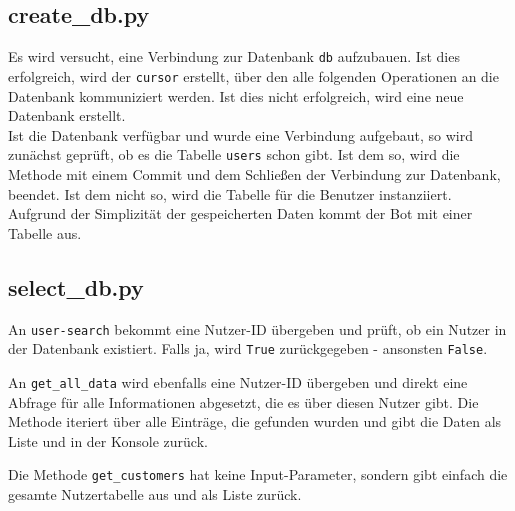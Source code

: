         \subsection{create\_db.py}
            Es wird versucht, eine Verbindung zur Datenbank \verb|db| aufzubauen. Ist dies erfolgreich, wird der \verb|cursor| erstellt, über den alle folgenden Operationen an die Datenbank kommuniziert werden. Ist dies nicht erfolgreich, wird eine neue Datenbank erstellt.\\
            Ist die Datenbank verfügbar und wurde eine Verbindung aufgebaut, so wird zunächst geprüft, ob es die Tabelle \verb|users| schon gibt. Ist dem so, wird die Methode mit einem Commit und dem Schließen der Verbindung zur Datenbank, beendet. Ist dem nicht so, wird die Tabelle für die Benutzer instanziiert. Aufgrund der Simplizität der gespeicherten Daten kommt der Bot mit einer Tabelle aus.


        \subsection{select\_db.py} \label{select_db.py}

            An \verb|user-search| bekommt eine Nutzer-ID übergeben und prüft, ob ein Nutzer in der Datenbank existiert. Falls ja, wird \verb|True| zurückgegeben - ansonsten \verb|False|.

                An \verb|get_all_data| wird ebenfalls eine Nutzer-ID übergeben und direkt eine Abfrage für alle Informationen abgesetzt, die es über diesen Nutzer gibt. Die Methode iteriert über alle Einträge, die gefunden wurden und gibt die Daten als Liste und in der Konsole zurück.
                
                Die Methode \verb|get_customers| hat keine Input-Parameter, sondern gibt einfach die gesamte Nutzertabelle aus und als Liste zurück.

